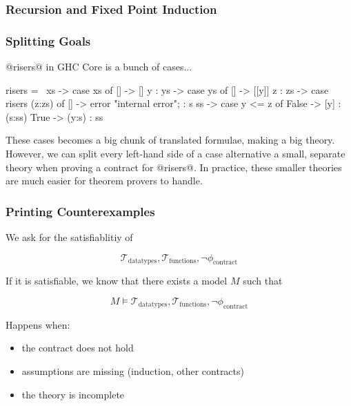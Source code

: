 \documentclass[serif,professionalfont]{beamer}
\begin{document}
\begin{frame}
  \frametitle{Recursion and Fixed Point Induction}

\end{frame}

\begin{frame}[fragile]
  \frametitle{Splitting Goals}
  @risers@ in GHC Core is a bunch of cases...

  \begin{code}
  risers = \ xs -> case xs of {
      [] -> []
      y : ys -> case ys of {
          [] -> [[y]]
          z : zs -> case risers (z:zs) of {
              [] -> error "internal error";
              : s ss -> case y <= z of {
                  False -> [y] : (s:ss)
                  True ->  (y:s) : ss
      } } } }
  \end{code}

  These cases becomes a big chunk of translated formulae, making a big
  theory. However, we can split every left-hand side of a case
  alternative a small, separate theory when proving a contract for
  @risers@. In practice, these smaller theories are much easier for
  theorem provers to handle.

\end{frame}

\begin{frame}[fragile]
  \frametitle{Printing Counterexamples}

  We ask for the satisfiablitiy of

  $$
    \mathcal{T}_{\text{datatypes}}, \mathcal{T}_{\text{functions}} ,
    \neg \phi_{\text{contract}}
  $$

  If it is satisfiable, we know that there exists a model $M$ such that

  $$
    M \models
    \mathcal{T}_{\text{datatypes}},
    \mathcal{T}_{\text{functions}} ,
    \neg \phi_{\text{contract}}
  $$

  Happens when:
    \begin{itemize}
      \item the contract does not hold

      \item assumptions are missing (induction, other contracts)

      \item the theory is incomplete
    \end{itemize}

\end{frame}
\end{document}
